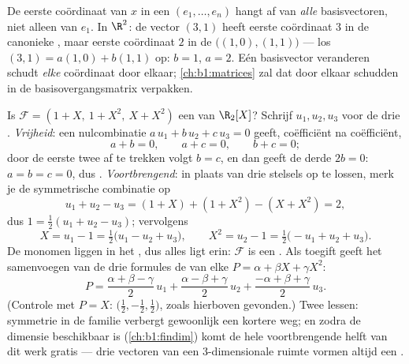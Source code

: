 \begin{remark}
\label{rem:b1:vspaces:teameffort}
De eerste coördinaat van $x$ in een  $(e_1, \dots, e_n)$ hangt
af van \emph{alle} basisvectoren, niet alleen van $e_1$. In
$\R^2$: de vector $(3, 1)$ heeft eerste coördinaat $3$ in de
canonieke , maar eerste coördinaat $2$ in de 
$\bigl((1,0), (1,1)\bigr)$ --- los $(3,1) = a(1,0) + b(1,1)$ op:
$b = 1$, $a = 2$. Eén basisvector veranderen schudt \emph{elke}
coördinaat door elkaar; \cref{ch:b1:matrices} zal dat door elkaar
schudden in de basisovergangsmatrix verpakken.
\end{remark}

\begin{example}
\label{ex:b1:vspaces:testbasis}
Is $\mathcal{F} = (1 + X,\ 1 + X^2,\ X + X^2)$ een  van
$\R_2[X]$? Schrijf $u_1, u_2, u_3$ voor de drie .
\emph{Vrijheid}: een nulcombinatie $a\,u_1 + b\,u_2 + c\,u_3 = 0$
geeft, coëfficiënt na coëfficiënt,
\[
a + b = 0, \qquad a + c = 0, \qquad b + c = 0 ;
\]
door de eerste twee af te trekken volgt $b = c$, en dan geeft de
derde $2b = 0$: $a = b = c = 0$, dus . \emph{Voortbrengend}:
in plaats van drie stelsels op te lossen, merk je de symmetrische
combinatie op
\[
u_1 + u_2 - u_3 = (1 + X) + (1 + X^2) - (X + X^2) = 2 ,
\]
dus $1 = \frac12(u_1 + u_2 - u_3)$; vervolgens
\[
X = u_1 - 1 = \tfrac12\bigl(u_1 - u_2 + u_3\bigr),
\qquad
X^2 = u_2 - 1 = \tfrac12\bigl(-u_1 + u_2 + u_3\bigr).
\]
De monomen liggen in het , dus alles ligt erin:
$\mathcal{F}$ is een . Als toegift geeft het samenvoegen van
de drie formules de  van elke $P = \alpha + \beta X +
\gamma X^2$:
\[
P = \frac{\alpha + \beta - \gamma}{2}\,u_1
+ \frac{\alpha - \beta + \gamma}{2}\,u_2
+ \frac{-\alpha + \beta + \gamma}{2}\,u_3 .
\]
(Controle met $P = X$:  $\bigl(\frac12, -\frac12,
\frac12\bigr)$, zoals hierboven gevonden.) Twee lessen: symmetrie
in de familie verbergt gewoonlijk een kortere weg; en zodra de
dimensie beschikbaar is (\cref{ch:b1:findim}) komt de hele
voortbrengende helft van dit werk gratis --- drie  vectoren
van een $3$-dimensionale ruimte vormen altijd een .
\end{example}

